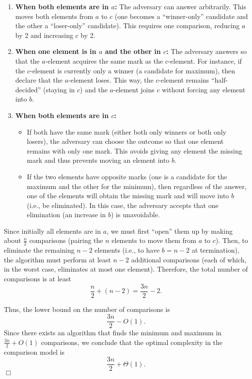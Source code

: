 \documentclass[11pt]{article}
\begin{document}
    \begin{enumerate}
        \item \textbf{When both elements are in \( a \):}  
        The adversary can answer arbitrarily. This moves both elements from \( a \) to \( c \) (one becomes a “winner-only” candidate and the other a “loser-only” candidate). This requires one comparison, reducing \( a \) by 2 and increasing \( c \) by 2.
    
        \item \textbf{When one element is in \( a \) and the other in \( c \):}  
        The adversary answers so that the \( a \)-element acquires the same mark as the \( c \)-element. For instance, if the \( c \)-element is currently only a winner (a candidate for maximum), then declare that the \( a \)-element loses. This way, the \( c \)-element remains “half-decided” (staying in \( c \)) and the \( a \)-element joins \( c \) without forcing any element into \( b \).
    
        \item \textbf{When both elements are in \( c \):}  
        \begin{itemize}
            \item If both have the same mark (either both only winners or both only losers), the adversary can choose the outcome so that one element remains with only one mark. This avoids giving any element the missing mark and thus prevents moving an element into \( b \).
            \item If the two elements have opposite marks (one is a candidate for the maximum and the other for the minimum), then regardless of the answer, one of the elements will obtain the missing mark and will move into \( b \) (i.e., be eliminated). In this case, the adversary accepts that one elimination (an increase in \( b \)) is unavoidable.
        \end{itemize}
    \end{enumerate}
    
    Since initially all elements are in \( a \), we must first “open” them up by making about \( \frac{n}{2} \) comparisons (pairing the \( n \) elements to move them from \( a \) to \( c \)). Then, to eliminate the remaining \( n-2 \) elements (i.e., to have \( b = n-2 \) at termination), the algorithm must perform at least \( n-2 \) additional comparisons (each of which, in the worst case, eliminates at most one element). Therefore, the total number of comparisons is at least
    \[
    \frac{n}{2} + (n-2) = \frac{3n}{2} - 2.
    \]
    
    Thus, the lower bound on the number of comparisons is 
    \[
    \frac{3n}{2} - O(1).
    \]
    Since there exists an algorithm that finds the minimum and maximum in \(\frac{3n}{2} + O(1)\) comparisons, we conclude that the optimal complexity in the comparison model is
    \[
    \frac{3n}{2} + \Theta(1).
    \]
    \hfill\(\Box\)
\end{document}
